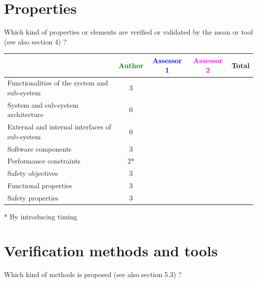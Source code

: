 \section{Properties}

Which kind of properties or elements are verified or validated by the mean or tool (see also \citep{D4.1} section 4)  ?



\begin{tabular}{|l | c | c | c | c|}
\hline
& \textcolor{green}{Author} & \textcolor{blue}{Assessor 1} & \textcolor{magenta}{Assessor 2} & Total \\
\hline 
Functionalities of the system and sub-system & 3& & &  \\
\hline
System and sub-system architecture & 0& & &  \\
\hline
External and internal interfaces of sub-system & 0& & &  \\
\hline
Software components & 3& & &  \\
\hline
Performance constraints & 2*& & &  \\
\hline
Safety objectives & 3& & &  \\
\hline
Functional properties & 3& & &  \\
\hline
Safety properties & 3& & &  \\
\hline
\end{tabular}

\begin{author_comment}
 * By introducing timing
\end{author_comment}


\section{Verification methods and tools}

Which kind of methods is proposed (see also \citep{D4.1} section 5.3) ?



